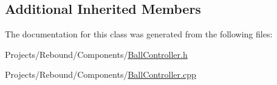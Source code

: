 \subsection*{Additional Inherited Members}


The documentation for this class was generated from the following files\-:\begin{DoxyCompactItemize}
\item 
Projects/\-Rebound/\-Components/\hyperlink{BallController_8h}{Ball\-Controller.\-h}\item 
Projects/\-Rebound/\-Components/\hyperlink{BallController_8cpp}{Ball\-Controller.\-cpp}\end{DoxyCompactItemize}
